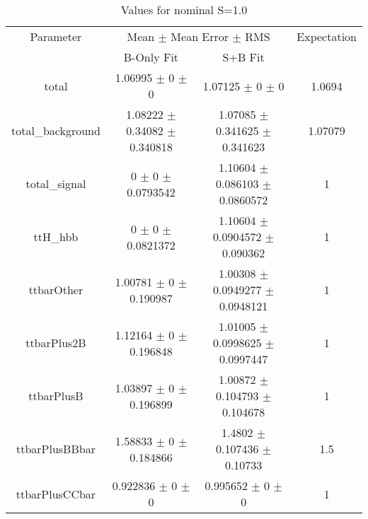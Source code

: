 \begin{table}
\centering
\caption{Values for nominal S=1.0}
\begin{tabular}{cccc}
\toprule
Parameter & \multicolumn{2}{c}{Mean $\pm$ Mean Error $\pm$ RMS} & Expectation\\
 & B-Only Fit & S+B Fit & \\
\midrule
total & \num{1.06995} $\pm$ \num{0} $\pm$ \num{0} & \num{1.07125} $\pm$ \num{0} $\pm$ \num{0} & \num{1.0694}\\
total\_background & \num{1.08222} $\pm$ \num{0.34082} $\pm$ \num{0.340818} & \num{1.07085} $\pm$ \num{0.341625} $\pm$ \num{0.341623} & \num{1.07079}\\
total\_signal & \num{0} $\pm$ \num{0} $\pm$ \num{0.0793542} & \num{1.10604} $\pm$ \num{0.086103} $\pm$ \num{0.0860572} & \num{1}\\
ttH\_hbb & \num{0} $\pm$ \num{0} $\pm$ \num{0.0821372} & \num{1.10604} $\pm$ \num{0.0904572} $\pm$ \num{0.090362} & \num{1}\\
ttbarOther & \num{1.00781} $\pm$ \num{0} $\pm$ \num{0.190987} & \num{1.00308} $\pm$ \num{0.0949277} $\pm$ \num{0.0948121} & \num{1}\\
ttbarPlus2B & \num{1.12164} $\pm$ \num{0} $\pm$ \num{0.196848} & \num{1.01005} $\pm$ \num{0.0998625} $\pm$ \num{0.0997447} & \num{1}\\
ttbarPlusB & \num{1.03897} $\pm$ \num{0} $\pm$ \num{0.196899} & \num{1.00872} $\pm$ \num{0.104793} $\pm$ \num{0.104678} & \num{1}\\
ttbarPlusBBbar & \num{1.58833} $\pm$ \num{0} $\pm$ \num{0.184866} & \num{1.4802} $\pm$ \num{0.107436} $\pm$ \num{0.10733} & \num{1.5}\\
ttbarPlusCCbar & \num{0.922836} $\pm$ \num{0} $\pm$ \num{0} & \num{0.995652} $\pm$ \num{0} $\pm$ \num{0} & \num{1}\\
\bottomrule
\end{tabular}
\end{table}